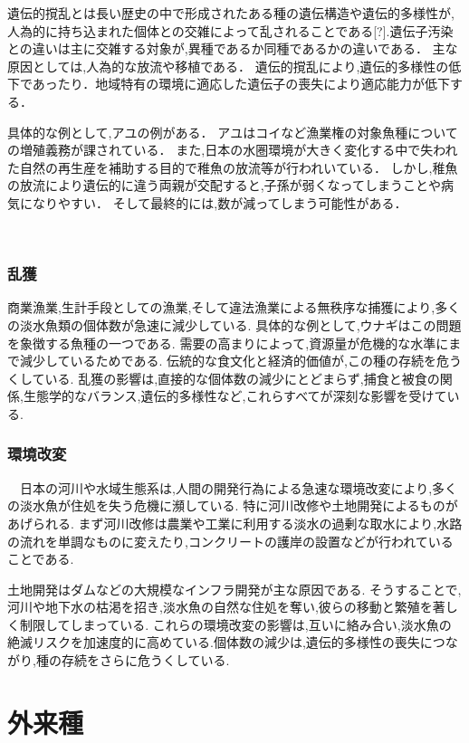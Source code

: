 \documentclass[12pt,a4j,titlepage]{ltjsarticle}
\begin{document}
遺伝的撹乱とは長い歴史の中で形成されたある種の遺伝構造や遺伝的多様性が,人為的に持ち込まれた個体との交雑によって乱されることである[?].遺伝子汚染との違いは主に交雑する対象が,異種であるか同種であるかの違いである．
主な原因としては,人為的な放流や移植である．
遺伝的撹乱により,遺伝的多様性の低下であったり．地域特有の環境に適応した遺伝子の喪失により適応能力が低下する．

具体的な例として,アユの例がある．
アユはコイなど漁業権の対象魚種についての増殖義務が課されている．
また,日本の水圏環境が大きく変化する中で失われた自然の再生産を補助する目的で稚魚の放流等が行われいている．
しかし,稚魚の放流により遺伝的に違う両親が交配すると,子孫が弱くなってしまうことや病気になりやすい．
そして最終的には,数が減ってしまう可能性がある．

　\subsubsection{乱獲}
商業漁業,生計手段としての漁業,そして違法漁業による無秩序な捕獲により,多くの淡水魚類の個体数が急速に減少している.
具体的な例として,ウナギはこの問題を象徴する魚種の一つである.
需要の高まりによって,資源量が危機的な水準にまで減少しているためである.
伝統的な食文化と経済的価値が,この種の存続を危うくしている.
乱獲の影響は,直接的な個体数の減少にとどまらず,捕食と被食の関係,生態学的なバランス,遺伝的多様性など,これらすべてが深刻な影響を受けている.

\subsubsection{環境改変}
　日本の河川や水域生態系は,人間の開発行為による急速な環境改変により,多くの淡水魚が住処を失う危機に瀕している.
特に河川改修や土地開発によるものがあげられる.
まず河川改修は農業や工業に利用する淡水の過剰な取水により,水路の流れを単調なものに変えたり,コンクリートの護岸の設置などが行われていることである.

土地開発はダムなどの大規模なインフラ開発が主な原因である.
そうすることで,河川や地下水の枯渇を招き,淡水魚の自然な住処を奪い,彼らの移動と繁殖を著しく制限してしまっている.
これらの環境改変の影響は,互いに絡み合い,淡水魚の絶滅リスクを加速度的に高めている.個体数の減少は,遺伝的多様性の喪失につながり,種の存続をさらに危うくしている.
\clearpage

\section{外来種}
\end{document}
